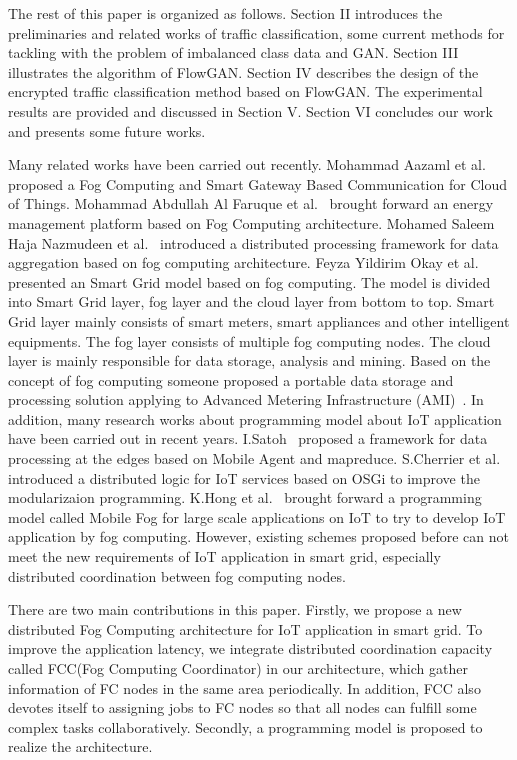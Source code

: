 \documentclass[conference]{IEEEtran}
\begin{document}
The rest of this paper is organized as follows. Section II introduces the preliminaries and related works of traffic classification, some current methods for tackling with the problem of imbalanced class data and GAN. Section III illustrates the algorithm of FlowGAN. Section IV describes the design of the encrypted traffic classification method based on FlowGAN. The experimental results are provided and discussed in Section V. Section VI  concludes our work and presents some future works.










Many related works have been carried out recently. Mohammad Aazaml et al.~\cite{Aazam2014gateway} proposed a Fog Computing and Smart Gateway Based Communication for Cloud of Things.   Mohammad Abdullah Al Faruque et al.~\cite{Faruque2016energy} brought forward an energy management platform based on Fog Computing architecture. Mohamed Saleem Haja Nazmudeen et al.~\cite{Nazmudeen2016PLC} introduced a distributed processing framework for data aggregation based on fog computing architecture. Feyza Yildirim Okay et al.~\cite{Okay2016smartgrid} presented an Smart Grid model based on fog computing. The model is divided into Smart  Grid layer, fog layer and the cloud layer from bottom to top. Smart Grid layer mainly consists of smart meters, smart appliances and other intelligent equipments. The fog layer consists of multiple fog computing nodes. The cloud layer is mainly responsible for data storage, analysis and mining. Based on the concept of fog computing someone proposed a portable data storage and processing solution applying to Advanced Metering Infrastructure (AMI)~\cite{Yan2016AMI}. In addition, many research works about programming model about IoT application have been carried out in recent years. I.Satoh~\cite{Satoh2013} proposed a framework for data processing at the edges based on Mobile Agent and mapreduce. S.Cherrier et al.~\cite{Cherrier2011} introduced a distributed logic for IoT services based on OSGi to improve the modularizaion programming. K.Hong et al.~\cite{Hong2013} brought forward a programming model called Mobile Fog for large scale applications on IoT to try to develop IoT application by fog computing.
However, existing schemes proposed before can not meet the new requirements of IoT application in smart grid, especially distributed coordination between fog computing nodes.

There are two main contributions in this paper. Firstly, we propose a new distributed Fog Computing architecture for IoT application in smart grid. To improve the application latency, we integrate distributed coordination capacity called FCC(Fog Computing Coordinator) in our architecture, which gather information of FC nodes in the same area periodically. In addition, FCC also devotes itself to assigning jobs to FC nodes so that all nodes can fulfill some complex tasks collaboratively. Secondly, a programming model is proposed to realize the architecture. 
\end{document}
